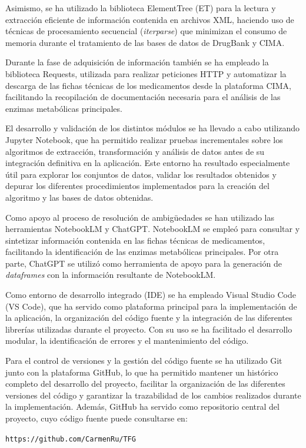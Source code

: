 Asimismo, se ha utilizado la biblioteca ElementTree (ET) para la lectura y extracción eficiente de información contenida en archivos XML, haciendo uso de técnicas de procesamiento secuencial (\textit{iterparse}) que minimizan el consumo de memoria durante el tratamiento de las bases de datos de DrugBank y CIMA.

Durante la fase de adquisición de información también se ha empleado la biblioteca Requests, utilizada para realizar peticiones HTTP y automatizar la descarga de las fichas técnicas de los medicamentos desde la plataforma CIMA, facilitando la recopilación de documentación necesaria para el análisis de las enzimas metabólicas principales.

El desarrollo y validación de los distintos módulos se ha llevado a cabo utilizando Jupyter Notebook, que ha permitido realizar pruebas incrementales sobre los algoritmos de extracción, transformación y análisis de datos antes de su integración definitiva en la aplicación. Este entorno ha resultado especialmente útil para explorar los conjuntos de datos, validar los resultados obtenidos y depurar los diferentes procedimientos implementados para la creación del algoritmo y las bases de datos obtenidas.

Como apoyo al proceso de resolución de ambigüedades se han utilizado las herramientas NotebookLM y ChatGPT. NotebookLM se empleó para consultar y sintetizar información contenida en las fichas técnicas de medicamentos, facilitando la identificación de las enzimas metabólicas principales. Por otra parte, ChatGPT se utilizó como herramienta de apoyo para la generación de \textit{dataframes} con la información resultante de NotebookLM.

Como entorno de desarrollo integrado (IDE) se ha empleado Visual Studio Code (VS Code), que ha servido como 
plataforma principal para la implementación de la aplicación, la organización del código fuente y la integración de 
las diferentes librerías utilizadas durante el proyecto. Con su uso se ha facilitado el desarrollo modular, la 
identificación de errores y el mantenimiento del código.

Para el control de versiones y la gestión del código fuente se ha utilizado Git junto con la plataforma GitHub, lo 
que ha permitido mantener un histórico completo del desarrollo del proyecto, facilitar la organización de las 
diferentes versiones del código y garantizar la trazabilidad de los cambios realizados durante la implementación. 
Además, GitHub ha servido como repositorio central del proyecto, cuyo código fuente puede consultarse en:
\begin{center}
    \texttt{https://github.com/CarmenRu/TFG}
\end{center}

